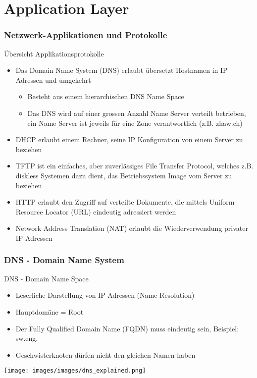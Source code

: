 \section{Application Layer}

\subsubsection{Netzwerk-Applikationen und Protokolle}

\begin{KR}{Übersicht Applikationsprotokolle}
    \begin{itemize}
        \item Das Domain Name System (DNS) erlaubt übersetzt Hostnamen in IP Adressen und umgekehrt
        \begin{itemize}
            \item Besteht aus einem hierarchischen DNS Name Space
            \item Das DNS wird auf einer grossen Anzahl Name Server verteilt betrieben, ein Name Server ist jeweils für eine Zone verantwortlich (z.B. zhaw.ch)
        \end{itemize}
        \item DHCP erlaubt einem Rechner, seine IP Konfiguration von einem Server zu beziehen
        \item TFTP ist ein einfaches, aber zuverlässiges File Transfer Protocol, welches z.B. diskless Systemen dazu dient, das Betriebssystem Image vom Server zu beziehen
        \item HTTP erlaubt den Zugriff auf verteilte Dokumente, die mittels Uniform Resource Locator (URL) eindeutig adressiert werden
        \item Network Address Translation (NAT) erlaubt die Wiederverwendung privater IP-Adressen
    \end{itemize}
\end{KR}

\subsubsection{DNS - Domain Name System}

\begin{definition}{DNS - Domain Name Space}
    \begin{itemize}
        \item Leserliche Darstellung von IP-Adressen (Name Resolution)
        \item Hauptdomäne = Root
        \item Der Fully Qualified Domain Name (FQDN) muss eindeutig sein, Beispiel: sw.eng.
        \item Geschwisterknoten dürfen nicht den gleichen Namen haben
    \end{itemize}
    \texttt{[image: images/images/dns\_explained.png]}
\end{definition}

